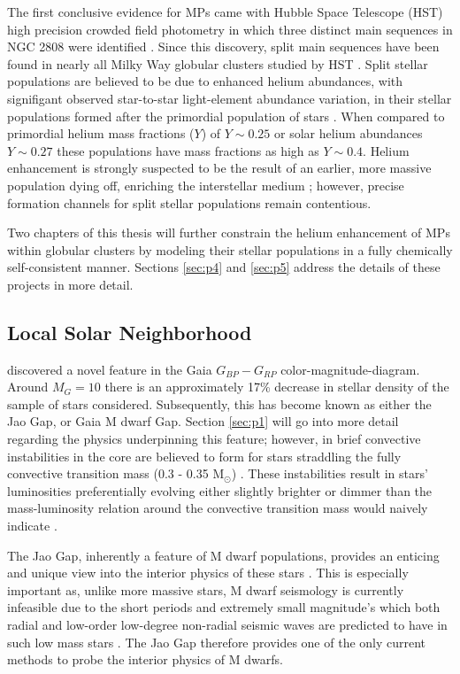The first conclusive evidence for MPs came with Hubble Space Telescope (HST)
high precision crowded field photometry in which three distinct main sequences
in NGC 2808 were identified \citep{Piotto2007}. Since this discovery, split
main sequences have been found in nearly all Milky Way globular clusters
studied by HST \citep{anderson2009,milone2011}. Split stellar populations are
believed to be due to enhanced helium abundances, with signifigant observed
star-to-star light-element abundance variation, in their stellar populations
formed after the primordial population of stars \citep{d2005,Piotto2007}. When
compared to primordial helium mass fractions ($Y$) of $Y\sim 0.25$
\citep{collaboration2016planck} or solar helium abundances $Y\sim0.27$
\citep{vinyoles2017new} these populations have mass fractions as high as $Y\sim
0.4$. Helium enhancement is strongly suspected to be the result of an earlier,
more massive population dying off, enriching the interstellar medium
\citep{Gratton2001, Gratton2004, Gratton2012}; however, precise formation
channels for split stellar populations remain contentious. 

Two chapters of this thesis will further constrain the helium enhancement of
MPs within globular clusters by modeling their stellar populations in a fully
chemically self-consistent manner. Sections \ref{sec:p4} and
\ref{sec:p5} address the details of these projects in more detail.

\subsection{Local Solar Neighborhood}
\citet{Jao2018} discovered a novel feature in the Gaia $G_{BP}-G_{RP}$
color-magnitude-diagram. Around $M_{G}=10$ there is an approximately 17\%
decrease in stellar density of the sample of stars \citeauthor{Jao2018}
considered. Subsequently, this has become known as either the Jao Gap, or Gaia
M dwarf Gap. Section \ref{sec:p1} will go into more detail regarding the
physics underpinning this feature; however, in brief convective instabilities
in the core are believed to form for stars straddling the fully convective
transition mass (0.3 - 0.35 M$_{\odot}$) \citep{Baraffe2018}. These
instabilities result in stars' luminosities preferentially evolving either
slightly brighter or dimmer than the mass-luminosity relation around the
convective transition mass would naively indicate \citep{Jao2020}.

The Jao Gap, inherently a feature of M dwarf populations, provides an enticing
and unique view into the interior physics of these stars \citep{Feiden2021}.
This is especially important as, unlike more massive stars, M dwarf seismology
is currently infeasible due to the short periods and extremely small
magnitude's which both radial and low-order low-degree non-radial seismic waves
are predicted to have in such low mass stars \citep{Rodriguez-Lopez2019}. The
Jao Gap therefore provides one of the only current methods to probe the
interior physics of M dwarfs.


